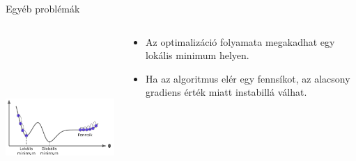 \documentclass[english, aspectratio=169]{beamer}
\begin{document}
\begin{frame}{Egyéb problémák}
\begin{columns}
\begin{column}{.5\textwidth}
\begin{center}
\includegraphics[width=7cm, height=7cm, keepaspectratio]{images/regresszio_23.png}
\end{center}
\end{column}
\begin{column}{.5\textwidth}
\begin{itemize}
	\item Az optimalizáció folyamata megakadhat egy lokális minimum helyen.
	\item Ha az algoritmus elér egy fennsíkot, az alacsony gradiens érték miatt instabillá válhat.
\end{itemize}
\end{column}
\end{columns}
\end{frame}
\end{document}

